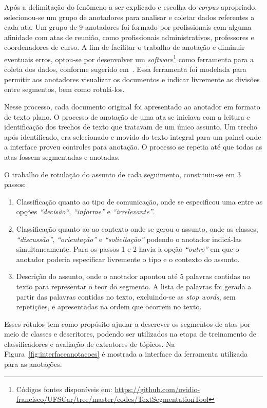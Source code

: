 Após a delimitação do fenômeno a ser explicado e escolha do \textit{corpus} apropriado, selecionou-se um grupo de anotadores para analisar e coletar dados referentes a cada ata. Um grupo de 9 anotadores foi formado por profissionais com alguma afinidade com atas de reunião, como profissionais administrativos, professores e coordenadores de curso. 
A fim de facilitar o trabalho de anotação e diminuir eventuais erros, optou-se por desenvolver um \textit{software}\footnote{Códigos fontes disponíveis em: \url{https://github.com/ovidio-francisco/UFSCar/tree/master/codes/TextSegmentationTool} } como ferramenta para a coleta dos dados, conforme sugerido em~\cite{Hovy2010}.  
Essa ferramenta foi modelada para permitir aos anotadores visualizar os documentos e indicar livremente as divisões entre segmentos, bem como rotulá-los.  

Nesse processo, cada documento original foi apresentado ao anotador em formato de texto plano. O processo de anotação de uma ata se iniciava com a leitura e identificação dos trechos de texto que tratavam de um único assunto. Um trecho após identificado, era selecionado e movido do texto integral para um painel onde a interface proveu controles para anotação. O processo se repetia até que todas as atas fossem segmentadas e anotadas.






O trabalho de rotulação do assunto de cada seguimento, constituiu-se em 3 passos:
\begin{enumerate}
	\item 

Classificação quanto ao tipo de comunicação, onde se especificou uma entre as opções 
\textit{``decisão``},
\textit{``informe''} e 
\textit{``irrelevante''}. 
	\item 
Classificação quanto ao ao contexto onde se gerou o assunto, onde as classes, 
\textit{``discussão''},
\textit{``orientação''} e	
\textit{``solicitação''} podendo o anotador indicá-las simultaneamente.
Para os passos 1 e 2 havia a opção \textit{``outro''} em que o anotador poderia especificar livremente o tipo e o contexto do assunto.
	\item 
		Descrição do assunto, onde o anotador apontou até 5 palavras contidas no texto para representar o teor do segmento. A lista de palavras foi gerada a partir das palavras contidas no texto, excluindo-se as \textit{stop words}, sem repetições, e apresentadas na ordem que ocorrem no texto.
\end{enumerate}
Esses rótulos tem como propósito ajudar a descrever os segmentos de atas por meio de classes e descritores, podendo ser utilizados na etapa de treinamento de classificadores e avaliação de extratores de tópicos.
Na Figura~\ref{fig:interfaceanotacoes} é mostrada a interface da ferramenta utilizada para as anotações.









